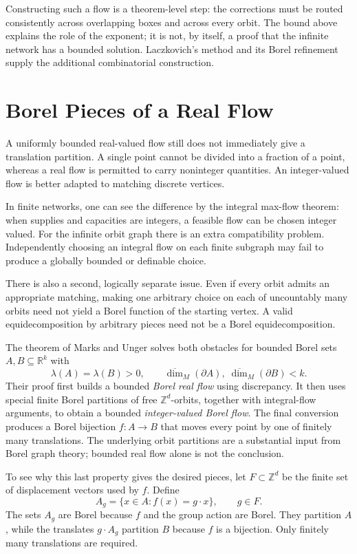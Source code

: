 Constructing such a flow is a theorem-level step: the corrections must be routed consistently across overlapping boxes and across every orbit. The bound above explains the role of the exponent; it is not, by itself, a proof that the infinite network has a bounded solution. Laczkovich's method and its Borel refinement supply the additional combinatorial construction.

\section{Borel Pieces of a Real Flow}

A uniformly bounded real-valued flow still does not immediately give a translation partition. A single point cannot be divided into a fraction of a point, whereas a real flow is permitted to carry noninteger quantities. An integer-valued flow is better adapted to matching discrete vertices.

In finite networks, one can see the difference by the integral max-flow theorem: when supplies and capacities are integers, a feasible flow can be chosen integer valued. For the infinite orbit graph there is an extra compatibility problem. Independently choosing an integral flow on each finite subgraph may fail to produce a globally bounded or definable choice.

There is also a second, logically separate issue. Even if every orbit admits an appropriate matching, making one arbitrary choice on each of uncountably many orbits need not yield a Borel function of the starting vertex. A valid equidecomposition by arbitrary pieces need not be a Borel equidecomposition.

The theorem of Marks and Unger solves both obstacles for bounded Borel sets \(A,B\subseteq\mathbb R^k\) with
\[
 \lambda(A)=\lambda(B)>0,\qquad
 \overline{\dim}_{M}(\partial A),\;
 \overline{\dim}_{M}(\partial B)<k.
\]
Their proof first builds a bounded \emph{Borel real flow} using discrepancy. It then uses special finite Borel partitions of free \(\mathbb Z^d\)-orbits, together with integral-flow arguments, to obtain a bounded \emph{integer-valued Borel flow}. The final conversion produces a Borel bijection \(f:A\to B\) that moves every point by one of finitely many translations. The underlying orbit partitions are a substantial input from Borel graph theory; bounded real flow alone is not the conclusion.

To see why this last property gives the desired pieces, let \(F\subset\mathbb Z^d\) be the finite set of displacement vectors used by \(f\). Define
\[
 A_g=\{x\in A:f(x)=g\cdot x\},\qquad g\in F.
\]
The sets \(A_g\) are Borel because \(f\) and the group action are Borel. They partition \(A\), while the translates \(g\cdot A_g\) partition \(B\) because \(f\) is a bijection. Only finitely many translations are required.

